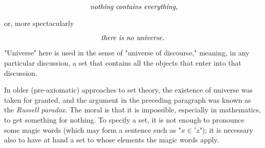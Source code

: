 \begin{equation*}
\text{ \textit{nothing contains everything,}}
\end{equation*}

or, more spectacularly

\begin{equation*}
\text{\textit{there is no universe.}}
\end{equation*}

"Universe" here is used in the sense of "universe of discourse," meaning, in any particular discussion, a set that contains all the objects that enter into that discussion. 

In older (pre-axiomatic) approaches to set theory, the existence of universe was taken for granted, and the argument in the preceding paragraph was known as the \textit{Russell paradox}. The moral is that it is impossible, especially in mathematics, to get something for nothing. To specify a set, it is not enough to pronounce some magic words (which may form a sentence such as "$x \in ' z$"); it is necessary also to have at hand a set to whose elements the magic words apply. 